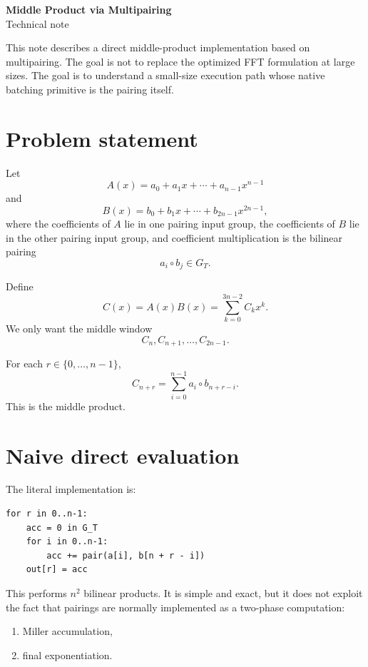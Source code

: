 \documentclass[11pt]{article}
\newcommand{\GT}{G_T}
\begin{document}
\begin{center}
  {\LARGE \textbf{Middle Product via Multipairing}}\\[0.5em]
  {\large Technical note}\\[0.75em]
\end{center}

\noindent
This note describes a direct middle-product implementation based on
multipairing. The goal is not to replace the optimized FFT formulation at
large sizes. The goal is to understand a small-size execution path whose
native batching primitive is the pairing itself.

\section{Problem statement}

Let
\[
A(x) = a_0 + a_1 x + \cdots + a_{n-1} x^{n-1}
\]
and
\[
B(x) = b_0 + b_1 x + \cdots + b_{2n-1} x^{2n-1},
\]
where the coefficients of $A$ lie in one pairing input group, the coefficients
of $B$ lie in the other pairing input group, and coefficient multiplication is
the bilinear pairing
\[
a_i \circ b_j \in \GT.
\]

Define
\[
C(x) = A(x)B(x) = \sum_{k=0}^{3n-2} C_k x^k.
\]
We only want the middle window
\[
C_n, C_{n+1}, \dots, C_{2n-1}.
\]

For each $r \in \{0,\dots,n-1\}$,
\[
C_{n+r} = \sum_{i=0}^{n-1} a_i \circ b_{n+r-i}.
\]
This is the middle product.

\section{Naive direct evaluation}

The literal implementation is:

\begin{lstlisting}
for r in 0..n-1:
    acc = 0 in G_T
    for i in 0..n-1:
        acc += pair(a[i], b[n + r - i])
    out[r] = acc
\end{lstlisting}

This performs $n^2$ bilinear products.
It is simple and exact, but it does not exploit the fact that pairings are
normally implemented as a two-phase computation:
\begin{enumerate}[itemsep=0.3em, topsep=0.4em]
  \item Miller accumulation,
  \item final exponentiation.
\end{enumerate}
\end{document}
